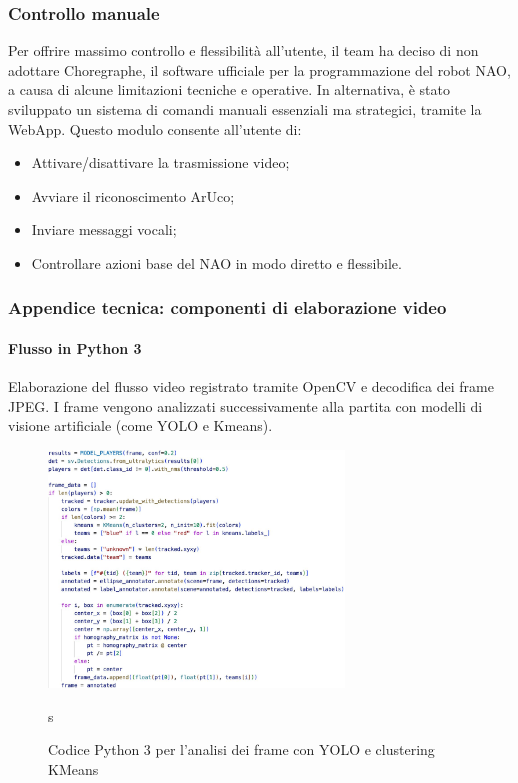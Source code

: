 \documentclass{optica-article}
\begin{document}
\subsubsection*{Controllo manuale}
Per offrire massimo controllo e flessibilità all’utente, il team ha deciso di non adottare Choregraphe, il software ufficiale per la programmazione del robot NAO, a causa di alcune limitazioni tecniche e operative. In alternativa, è stato sviluppato un sistema di comandi manuali essenziali ma strategici, tramite la WebApp. Questo modulo consente all’utente di:

\begin{itemize}
  \item Attivare/disattivare la trasmissione video;
  \item Avviare il riconoscimento ArUco;
  \item Inviare messaggi vocali;
  \item Controllare azioni base del NAO in modo diretto e flessibile.
\end{itemize}

\subsubsection*{Appendice tecnica: componenti di elaborazione video}

\paragraph{Flusso in Python 3}
Elaborazione del flusso video registrato tramite OpenCV e decodifica dei frame JPEG. I frame vengono analizzati successivamente alla partita con modelli di visione artificiale (come YOLO e Kmeans).


\begin{figure}
\centering
\includegraphics[width=0.7\textwidth]{figures/kmeans.jpg}
\caption{Codice Python 3 per l’analisi dei frame con YOLO e clustering KMeans}
\label{fig:enter-label}s
\end{figure}
\end{document}
